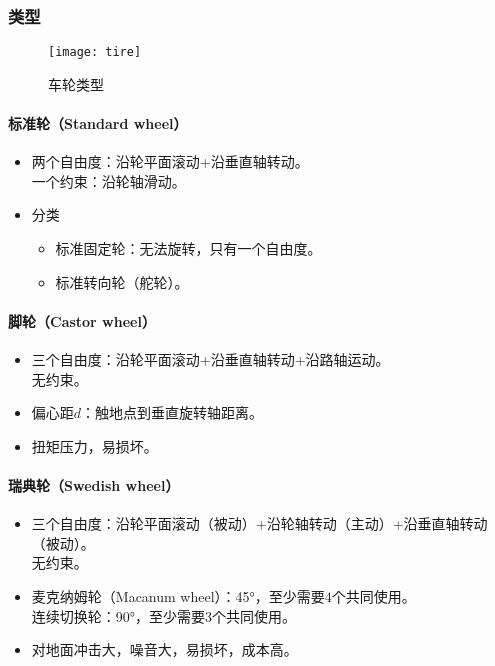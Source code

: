 \documentclass[
12pt, %
a4paper, 
oneside, %
headinclude,footinclude, %
]{scrartcl}
\begin{document}
\subsubsection{类型}
\begin{figure}[H]
\centering 
\texttt{[image: tire]} 
\caption[车轮类型]{车轮类型}
\end{figure}
\paragraph{标准轮（Standard wheel）}
\begin{itemize}
\item 两个自由度：沿轮平面滚动+沿垂直轴转动。 \\
一个约束：沿轮轴滑动。
\item 分类
\begin{itemize}
\item 标准固定轮：无法旋转，只有一个自由度。
\item 标准转向轮（舵轮）。
\end{itemize}
\end{itemize}
\paragraph{脚轮（Castor wheel）}
\begin{itemize}
\item 三个自由度：沿轮平面滚动+沿垂直轴转动+沿路轴运动。 \\
无约束。
\item 偏心距$ d $：触地点到垂直旋转轴距离。
\item 扭矩压力，易损坏。
\end{itemize}
\paragraph{瑞典轮（Swedish wheel）}
\begin{itemize}
\item 三个自由度：沿轮平面滚动（被动）+沿轮轴转动（主动）+沿垂直轴转动（被动）。 \\
无约束。
\item 麦克纳姆轮（Macanum wheel）：45°，至少需要$ 4 $个共同使用。 \\
连续切换轮：90°，至少需要$ 3 $个共同使用。
\item 对地面冲击大，噪音大，易损坏，成本高。
\end{itemize}
\end{document}
